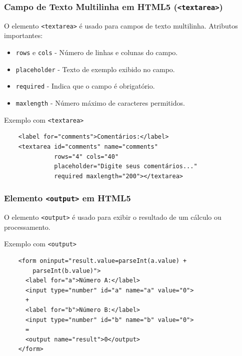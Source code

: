\documentclass{beamer}
\begin{document}
\begin{frame}[fragile]
  \frametitle{Campo de Texto Multilinha em HTML5 (\texttt{<textarea>})}

  O elemento \texttt{<textarea>} é usado para campos de texto multilinha. Atributos importantes:

  \begin{itemize}
    \item \texttt{rows} e \texttt{cols} - Número de linhas e colunas do campo.
    \item \texttt{placeholder} - Texto de exemplo exibido no campo.
    \item \texttt{required} - Indica que o campo é obrigatório.
    \item \texttt{maxlength} - Número máximo de caracteres permitidos.
  \end{itemize}

  \begin{block}{Exemplo com \texttt{<textarea>}}
    \begin{verbatim}
    <label for="comments">Comentários:</label>
    <textarea id="comments" name="comments"
              rows="4" cols="40"
              placeholder="Digite seus comentários..."
              required maxlength="200"></textarea>
    \end{verbatim}
  \end{block}
\end{frame}


\begin{frame}[fragile]
  \frametitle{Elemento \texttt{<output>} em HTML5}

  O elemento \texttt{<output>} é usado para exibir o resultado de um cálculo ou processamento. 

  \begin{block}{Exemplo com \texttt{<output>}}
    \begin{verbatim}
    <form oninput="result.value=parseInt(a.value) + 
        parseInt(b.value)">
      <label for="a">Número A:</label>
      <input type="number" id="a" name="a" value="0">
      +
      <label for="b">Número B:</label>
      <input type="number" id="b" name="b" value="0">
      =
      <output name="result">0</output>
    </form>
    \end{verbatim}
  \end{block}
\end{frame}
\end{document}
